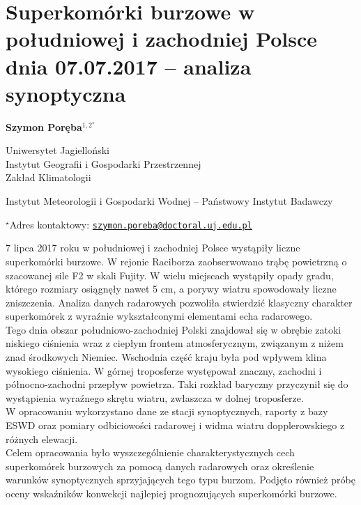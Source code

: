 \documentclass[\main/boa.tex]{subfiles}
\begin{document}
\section{Superkomórki burzowe w południowej i zachodniej Polsce dnia 07.07.2017 – analiza synoptyczna}

\begin{center}
  {\bf {} Szymon Poręba$^{1,2^\star}$}
\end{center}

\vskip 0.3cm

\begin{affiliations}
\begin{enumerate}
\begin{minipage}{0.915\textwidth}
\centering
\item Uniwersytet Jagielloński\\ Instytut Geografii i Gospodarki Przestrzennej\\ Zakład Klimatologii
\\[-2pt]
\item Instytut Meteorologii i Gospodarki Wodnej -- Państwowy Instytut Badawczy \\[-2pt]
\end{minipage}
\end{enumerate}
$^\star$Adres kontaktowy: \href{mailto:szymon.poreba@doctoral.uj.edu.pl}{\nolinkurl{szymon.poreba@doctoral.uj.edu.pl}}\\
\end{affiliations}

\vskip 0.5cm


\vskip 0.5cm

7 lipca 2017 roku w południowej i zachodniej Polsce wystąpiły liczne superkomórki burzowe. W rejonie Raciborza zaobserwowano trąbę powietrzną o szacowanej sile F2 w skali Fujity.  W wielu miejscach wystąpiły opady gradu, którego rozmiary osiągnęły nawet 5 cm, a porywy wiatru spowodowały liczne zniszczenia. Analiza danych radarowych pozwoliła stwierdzić klasyczny charakter superkomórek z wyraźnie wykształconymi elementami echa radarowego. \\
Tego dnia obszar południowo-zachodniej Polski znajdował się w obrębie zatoki niskiego ciśnienia wraz z ciepłym frontem atmosferycznym, związanym z niżem znad środkowych Niemiec. Wschodnia część kraju była pod wpływem  klina wysokiego ciśnienia. W górnej troposferze występował znaczny, zachodni i północno-zachodni przepływ powietrza. Taki rozkład baryczny przyczynił się do wystąpienia wyraźnego skrętu wiatru, zwłaszcza w dolnej troposferze. \\
W opracowaniu wykorzystano dane ze stacji synoptycznych, raporty z bazy ESWD oraz pomiary odbiciowości radarowej i widma wiatru dopplerowskiego z różnych elewacji.\\
Celem opracowania było wyszczególnienie charakterystycznych cech superkomórek burzowych za pomocą danych radarowych oraz określenie warunków synoptycznych sprzyjających tego typu burzom. Podjęto również próbę oceny wskaźników konwekcji najlepiej prognozujących superkomórki burzowe.
\end{document}
